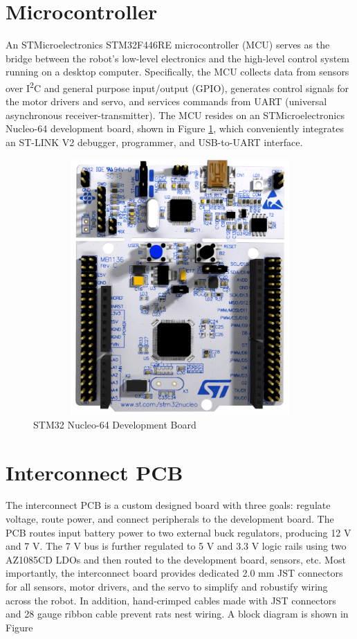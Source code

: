 \section{Microcontroller}
An STMicroelectronics STM32F446RE microcontroller (MCU) serves as the bridge between the robot's low-level electronics and the high-level control system running on a desktop computer. Specifically, the MCU collects data from sensors over I\textsuperscript{2}C and general purpose input/output (GPIO), generates control signals for the motor drivers and servo, and services commands from UART (universal asynchronous receiver-transmitter). The MCU resides on an STMicroelectronics Nucleo-64 development board, shown in Figure \ref{fig:nucleo64}, which conveniently integrates an ST-LINK V2 debugger, programmer, and USB-to-UART interface.

\begin{figure}[H]   %
	\centering \includegraphics[width=6in, height=3.85in, keepaspectratio]{figures/nucleo64.png}
	\caption{STM32 Nucleo-64 Development Board \cite{nucleo64_manual}}\label{fig:nucleo64}
\end{figure}

\section{Interconnect PCB}
The interconnect PCB is a custom designed board with three goals: regulate voltage, route power, and connect peripherals to the development board. The PCB routes input battery power to two external buck regulators, producing 12 V and 7 V. The 7 V bus is further regulated to 5 V and 3.3 V logic rails using two AZ1085CD LDOs and then routed to the development board, sensors, etc. Most importantly, the interconnect board provides dedicated 2.0 mm JST connectors for all sensors, motor drivers, and the servo to simplify and robustify wiring across the robot. In addition, hand-crimped cables made with JST connectors and 28 gauge ribbon cable prevent rats nest wiring. A block diagram is shown in Figure 

